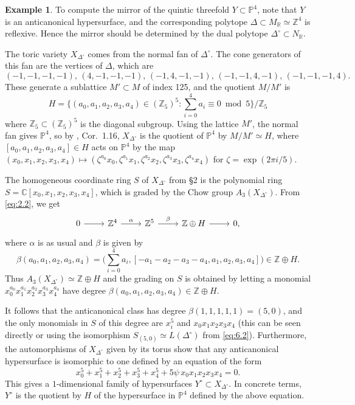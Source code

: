 \documentclass{amsart}
\theoremstyle{plain}
\theoremstyle{definition}
\newtheorem*{example}{Example}
\begin{document}
\begin{example} To compute the mirror of the quintic threefold $Y
\subset \mathbb{P}^4$, note that $Y$ is an anticanonical hypersurface,
and the corresponding polytope $\Delta \subset M_\mathbb{R} \simeq \mathbb{Z}^4$ is reflexive.  Hence the mirror should be determined by the dual
polytope $\Delta^\circ \subset N_\mathbb{R}$.

	The toric variety $X_{\Delta^\circ}$ comes from the normal fan
of $\Delta^\circ$.  The cone generators of this fan are the vertices of
$\Delta$, which are
\[
(-1,-1,-1,-1),\, (4,-1,-1,-1),\, (-1,4,-1,-1),\,
(-1,-1,4,-1),\, (-1,-1,-1,4).
\]
These generate a sublattice $M' \subset M$ of index 125, and
the quotient $M/M'$ is 
\[
H = \big\{(a_0,a_1,a_2,a_3,a_4) \in (\mathbb{Z}_5)^5 :
{\textstyle{\sum_{i=0}^4}} a_i \equiv 0 \bmod 5\big\}/\mathbb{Z}_5
\]
where $\mathbb{Z}_5 \subset (\mathbb{Z}_5)^5$ is the diagonal subgroup.
Using the lattice $M'$, the normal fan gives $\mathbb{P}^4$, so by
\cite{Oda1}, Cor.~1.16, $X_{\Delta^\circ}$ is the quotient of
$\mathbb{P}^4$ by $M/M' \simeq H$, where $[a_0,a_1,a_2,a_3,a_4] \in H$
acts on $\mathbb{P}^4$ by the map $(x_0,x_1,x_2,x_3,x_4) \mapsto
(\zeta^{a_0} x_0,\zeta^{a_1} x_1, \zeta^{a_2} x_2,\zeta^{a_3}
x_3,\zeta^{a_4} x_4)$ for $\zeta = \exp(2\pi i/5)$.

	The homogeneous coordinate ring $S$ of $X_{\Delta^\circ}$ from
\S2 is the polynomial ring $S= \mathbb{C}[x_0,x_1,x_2,x_3,x_4]$, which is
graded by the Chow group $A_3(X_{\Delta^\circ})$.  From \eqref{eq:2.2},
we get
\[
\begin{tikzcd}
0 \arrow[r] & \mathbb{Z}^4 \arrow[r, "\alpha"] & \mathbb{Z}^5 \arrow[r, "\beta"] & \mathbb{Z}\oplus H \arrow[r] & 0,
\end{tikzcd}
\]
where $\alpha$ is as usual and $\beta$ is given by
\[
\beta(a_0,a_1,a_2,a_3,a_4) = \big({\textstyle{\sum_{i=0}^4}} a_i,
[-a_1-a_2-a_3-a_4,a_1,a_2,a_3,a_4]\big) \in \mathbb{Z}\oplus H.
\]
Thus $A_3(X_{\Delta^\circ}) \simeq \mathbb{Z}\oplus H$ and the grading
on $S$ is obtained by letting a monomial $x_0^{a_0} x_1^{a_1}
x_2^{a_2} x_3^{a_3} x_4^{a_4}$ have
degree $\beta(a_0,a_1,a_2,a_3,a_4) \in \mathbb{Z}\oplus H$.

	It follows that the anticanonical class has degree
$\beta(1,1,1,1,1) = (5,0)$, and the only monomials in $S$ of this
degree are $x_i^5$ and $x_0x_1x_2x_3x_4$ (this can be seen directly or
using the isomorphism $S_{(5,0)} \simeq L(\Delta^\circ)$ from
\eqref{eq:6.2}).  Furthermore, the automorphisms of $X_{\Delta^\circ}$
given by its torus show that any anticanonical hypersurface is
isomorphic to one defined by an equation of the form
\[
x_0^5 + x_1^5 + x_2^5 + x_3^5 + x_4^5 + 5 \psi\, x_0 x_1 x_2 x_3 x_4 =
0.
\]
This gives a $1$-dimensional family of hypersurfaces $Y^\circ \subset
X_{\Delta^\circ}$.  In concrete terms, $Y^\circ$ is the quotient by
$H$ of the hypersurface in $\mathbb{P}^4$ defined by the above equation.


\end{example}
\end{document}
